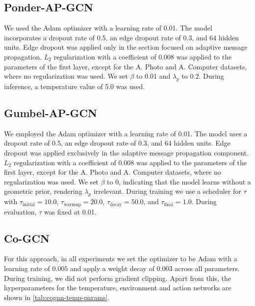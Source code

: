 \documentclass{gdl}
\begin{document}
\subsection{Ponder-AP-GCN}
\label{lab:hyper-ponder-gcn}
We used the Adam optimizer with a learning rate of 0.01. The model incorporates a dropout rate of 0.5, an edge dropout rate of 0.3, and 64 hidden units. Edge dropout was applied only in the section focused on adaptive message propagation. $L_2$ regularization with a coefficient of 0.008 was applied to the parameters of the first layer, except for the A. Photo and A. Computer datasets, where no regularization was used. We set $\beta$ to 0.01 and $\lambda_p$ to 0.2. During inference, a temperature value of 5.0 was used.

\subsection{Gumbel-AP-GCN}
\label{lab:hyper-gumbel-gcn}
We employed the Adam optimizer with a learning rate of 0.01. The model uses a dropout rate of 0.5, an edge dropout rate of 0.3, and 64 hidden units. Edge dropout was applied exclusively in the adaptive message propagation component. $L_2$ regularization with a coefficient of 0.008 was applied to the parameters of the first layer, except for the A. Photo and A. Computer datasets, where no regularization was used. We set $\beta$ to 0, indicating that the model learns without a geometric prior, rendering $\lambda_p$ irrelevant. During training we use a scheduler for $\tau$ with $\tau_{\text{initial}} = 10.0$, $\tau_{\text{warmup}} = 20.0$, $\tau_{\text{decay}} = 50.0$, and $\tau_{\text{final}} = 1.0$. During evaluation, $\tau$ was fixed at 0.01.

\subsection{Co-GCN}
\label{lab:hyper-Co-GCN}
For this approach, in all experiments we set the optimizer to be Adam with a learning rate of $0.005$ and apply a weight decay of $0.003$ across all parameters. During training, we did not perform gradient clipping. Apart from this, the hyperparameters for the temperature, environment and action networks are shown in \autoref{tab:cognn-temp-params}.
\end{document}
